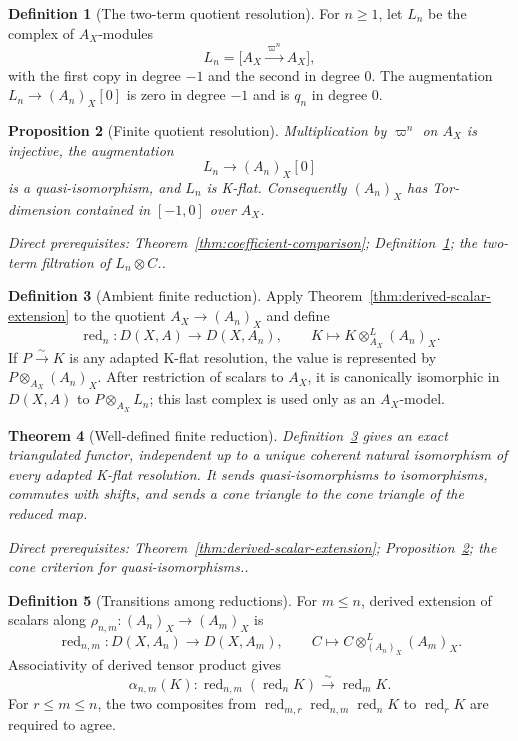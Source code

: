 \documentclass[10pt]{article}
\newtheorem{theorem}{Theorem}[section]
\newtheorem{proposition}[theorem]{Proposition}
\theoremstyle{definition}
\newtheorem{definition}[theorem]{Definition}
\newcommand{\depends}[1]{\par\smallskip\noindent\textit{Direct prerequisites:} #1.}
\begin{document}
\begin{definition}[The two-term quotient resolution]\label{def:quotient-resolution}
For $n\geq1$, let $L_n$ be the complex of $A_X$-modules
\[
 L_n=\bigl[A_X\xrightarrow{\ \varpi^n\ }A_X\bigr],
\]
with the first copy in degree $-1$ and the second in degree $0$.  The
augmentation $L_n\to(A_n)_X[0]$ is zero in degree $-1$ and is $q_n$ in
degree $0$.
\end{definition}

\begin{proposition}[Finite quotient resolution]\label{prop:quotient-resolution}
Multiplication by $\varpi^n$ on $A_X$ is injective, the augmentation
\[
 L_n\longrightarrow(A_n)_X[0]
\]
is a quasi-isomorphism, and $L_n$ is K-flat.  Consequently $(A_n)_X$ has
Tor-dimension contained in $[-1,0]$ over $A_X$.
\depends{Theorem~\ref{thm:coefficient-comparison};
Definition~\ref{def:quotient-resolution}; the two-term filtration of
$L_n\otimes C$.}
\end{proposition}

\begin{definition}[Ambient finite reduction]\label{def:finite-reduction}
Apply Theorem~\ref{thm:derived-scalar-extension} to the quotient
$A_X\to(A_n)_X$ and define
\[
 \operatorname{red}_n:D(X,A)\longrightarrow D(X,A_n),
 \qquad
 K\longmapsto K\otimes^L_{A_X}(A_n)_X.
\]
If $P\xrightarrow{\sim}K$ is any adapted K-flat resolution, the value is
represented by $P\otimes_{A_X}(A_n)_X$.  After restriction of scalars to
$A_X$, it is canonically isomorphic in $D(X,A)$ to
$P\otimes_{A_X}L_n$; this last complex is used only as an $A_X$-model.
\end{definition}

\begin{theorem}[Well-defined finite reduction]\label{thm:finite-reduction}
Definition~\ref{def:finite-reduction} gives an exact triangulated functor,
independent up to a unique coherent natural isomorphism of every adapted
K-flat resolution.  It sends quasi-isomorphisms to isomorphisms, commutes
with shifts, and sends a cone triangle to the cone triangle of the reduced
map.
\depends{Theorem~\ref{thm:derived-scalar-extension};
Proposition~\ref{prop:quotient-resolution}; the cone criterion for
quasi-isomorphisms.}
\end{theorem}

\begin{definition}[Transitions among reductions]\label{def:reduction-transitions}
For $m\leq n$, derived extension of scalars along
$\rho_{n,m}:(A_n)_X\to(A_m)_X$ is
\[
 \operatorname{red}_{n,m}:D(X,A_n)\longrightarrow D(X,A_m),
 \qquad C\longmapsto C\otimes^L_{(A_n)_X}(A_m)_X.
\]
Associativity of derived tensor product gives
\[
 \alpha_{n,m}(K):
 \operatorname{red}_{n,m}(\operatorname{red}_nK)
       \xrightarrow{\sim}\operatorname{red}_mK.
\]
For $r\leq m\leq n$, the two composites from
$\operatorname{red}_{m,r}\operatorname{red}_{n,m}\operatorname{red}_nK$
to $\operatorname{red}_rK$ are required to agree.
\end{definition}
\end{document}
